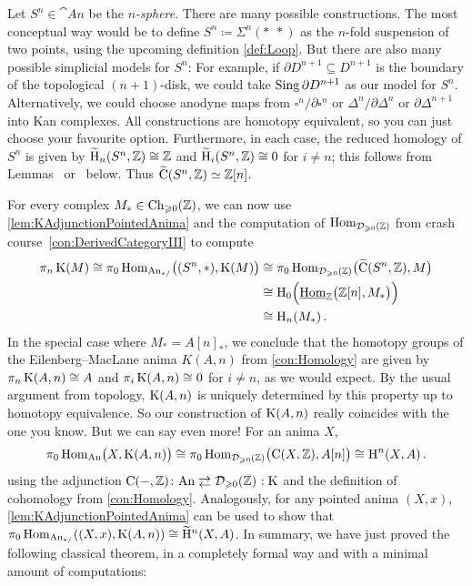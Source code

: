 \begin{numpar}\label{par:ComputationsWithEilenbergMacLane}
	Let $S^n\in\cat{An}$ be the \emph{$n$-sphere}. There are many possible constructions. The most conceptual way would be to  define $S^n\coloneqq \Sigma^n(*\ \,*)$ as the $n$-fold suspension of two points, using the upcoming definition  \cref{def:Loop}. But there are also many possible simplicial models for $S^n$: For example, if $\partial D^{n+1}\subseteq D^{n+1}$ is the boundary of the topological $(n+1)$-disk, we could take $\operatorname{Sing} \partial D^{n+1}$ as our model for $S^n$. Alternatively, we could choose anodyne maps from $\square^n/\partial\square^n$ or $\Delta^n/\partial\Delta^n$ or $\partial\Delta^{n+1}$ into Kan complexes. All constructions are homotopy equivalent, so you can just choose your favourite option. Furthermore, in each case, the reduced homology of $S^n$ is given by $\widetilde{\mathrm{H}}_n(S^n,\mathbb{Z})\cong \mathbb{Z}$ and $\widetilde{\mathrm{H}}_i(S^n,\mathbb{Z})\cong0$ for $i\neq n$; this follows from Lemmas~ or~ below. Thus $\widetilde{\operatorname{C}}(S^n,\mathbb{Z})\simeq \mathbb{Z}[n]$.
	
	For every complex $M_*\in\operatorname{Ch}_{\geqslant 0}(\mathbb{Z})$,  we can now use \cref{lem:KAdjunctionPointedAnima} and the computation of $\operatorname{Hom}_{\mathcal{D}_{\geqslant 0}(\mathbb{Z})}$ from crash course~\cref{con:DerivedCategoryIII} to compute
	\begin{align*}
		\pi_n \K(M)\cong \pi_0\Hom_{\cat{An}_{*/}}\lef((S^n,*),\K(M)\righ)&\cong \pi_0\Hom_{\Dd_{\geqslant 0}(\IZ)}\bigl(\widetilde{\C}(S^n,\IZ),M\bigr)\\
		&\cong \H_0\Bigl(\Hhom_\IZ\lef(\IZ[n],M_*\righ)\Bigr)\\
		&\cong \H_n(M_*)\,.
	\end{align*}
	In the special case where $M_*=A[n]_*$, we conclude that the homotopy groups of the Eilenberg--MacLane anima $K(A,n)$ from \cref{con:Homology} are given by $\pi_n\operatorname{K}(A,n)\cong A$ and $\pi_i\operatorname{K}(A,n)\cong0$ for $i\neq n$, as we would expect. By the usual argument from topology, $\operatorname{K}(A,n)$ is uniquely determined by this property up to homotopy equivalence. So our construction of $\operatorname{K}(A,n)$ really coincides with the one you know. But we can say even more! For an anima $X$,
	\begin{equation*}
		\pi_0\Hom_{\cat{An}}\lef(X,\K(A,n)\righ)\cong \pi_0\Hom_{\Dd_{\geqslant 0}(\IZ)}\lef(\C(X,\IZ),A[n]\righ)\cong \H^n(X,A)\,.
	\end{equation*}
	using the adjunction $\C(-,\IZ)\colon\cat{An}\shortdoublelrmorphism \Dd_{\geqslant 0}(\IZ)\noloc \K$ and the definition of cohomology from \cref{con:Homology}. Analogously, for any pointed anima $(X,x)$, \cref{lem:KAdjunctionPointedAnima} can be used to show that  $\pi_0\operatorname{Hom}_{\mathrm{An}_{*/}}((X,x),\operatorname{K}(A,n))\cong \widetilde{\mathrm{H}}^n(X,A)$. In summary, we have just proved the following classical theorem, in a completely formal way and with a minimal amount of computations:
\end{numpar}
